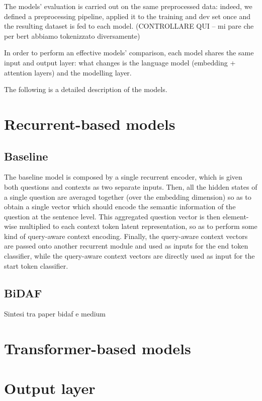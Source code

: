 \documentclass[a4paper,10pt]{report}
\begin{document}
The models’ evaluation is carried out on the same preprocessed data: indeed, we defined a preprocessing pipeline, applied it to the training and dev set once and the resulting dataset is fed to each model. (CONTROLLARE QUI – mi pare che per bert abbiamo tokenizzato diversamente)

In order to perform an effective models’ comparison, each model shares the same input and output layer: what changes is the language model (embedding + attention layers) and the modelling layer.

The following is a detailed description of the models.

\section{Recurrent-based models}\label{sec:recurrent-models}
\subsection{Baseline}\label{subsec:baseline}

The baseline model is composed by a single recurrent encoder, which is given both questions and contexts as two separate inputs. Then, all the hidden states of a single question are averaged together (over the embedding dimension) so as to obtain a single vector which should encode the semantic information of the question at the sentence level. This aggregated question vector is then element-wise multiplied to each context token latent representation, so as to perform some kind of query-aware context encoding. Finally, the query-aware context vectors are passed onto another recurrent module and used as inputs for the end token classifier, while the query-aware context vectors are directly used as input for the start token classifier.

\subsection{BiDAF}\label{subsec:bidaf}

Sintesi tra paper bidaf e medium

\section{Transformer-based models}\label{sec:transformer-models}


\section{Output layer}\label{sec:output-layer}
\end{document}
